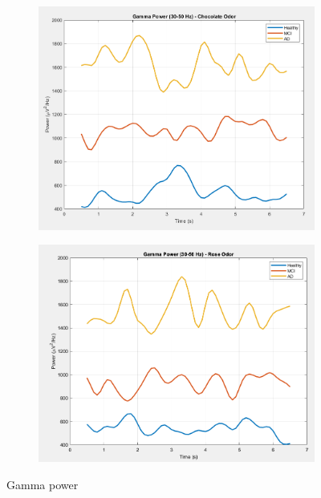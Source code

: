 \documentclass[hidelinks,12pt]{article}
\begin{document}
	\begin{figure}[!h]
		\centering
		\begin{subfigure}{0.48\textwidth}
			\centering
			\includegraphics[height=0.8\linewidth]{plots/2}
		\end{subfigure}
		\hfill
		\begin{subfigure}{0.48\textwidth}
			\centering
			\includegraphics[height=0.8\linewidth]{plots/4}
		\end{subfigure}
		\caption{Gamma power}
	\end{figure}
	
\end{document}
